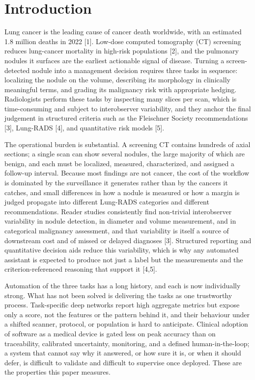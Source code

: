 \documentclass[12pt]{article}
\begin{document}
\section{Introduction}

Lung cancer is the leading cause of cancer death worldwide, with an estimated 1.8 million deaths in 2022 [1]. Low-dose computed tomography (CT) screening reduces lung-cancer mortality in high-risk populations [2], and the pulmonary nodules it surfaces are the earliest actionable signal of disease. Turning a screen-detected nodule into a management decision requires three tasks in sequence: localizing the nodule on the volume, describing its morphology in clinically meaningful terms, and grading its malignancy risk with appropriate hedging. Radiologists perform these tasks by inspecting many slices per scan, which is time-consuming and subject to interobserver variability, and they anchor the final judgement in structured criteria such as the Fleischner Society recommendations [3], Lung-RADS [4], and quantitative risk models [5].


The operational burden is substantial. A screening CT contains hundreds of axial sections; a single scan can show several nodules, the large majority of which are benign, and each must be localized, measured, characterized, and assigned a follow-up interval. Because most findings are not cancer, the cost of the workflow is dominated by the surveillance it generates rather than by the cancers it catches, and small differences in how a nodule is measured or how a margin is judged propagate into different Lung-RADS categories and different recommendations. Reader studies consistently find non-trivial interobserver variability in nodule detection, in diameter and volume measurement, and in categorical malignancy assessment, and that variability is itself a source of downstream cost and of missed or delayed diagnoses [3]. Structured reporting and quantitative decision aids reduce this variability, which is why any automated assistant is expected to produce not just a label but the measurements and the criterion-referenced reasoning that support it [4,5].


Automation of the three tasks has a long history, and each is now individually strong. What has not been solved is delivering the tasks as one trustworthy process. Task-specific deep networks report high aggregate metrics but expose only a score, not the features or the pattern behind it, and their behaviour under a shifted scanner, protocol, or population is hard to anticipate. Clinical adoption of software as a medical device is gated less on peak accuracy than on traceability, calibrated uncertainty, monitoring, and a defined human-in-the-loop; a system that cannot say why it answered, or how sure it is, or when it should defer, is difficult to validate and difficult to supervise once deployed. These are the properties this paper measures.
\end{document}
